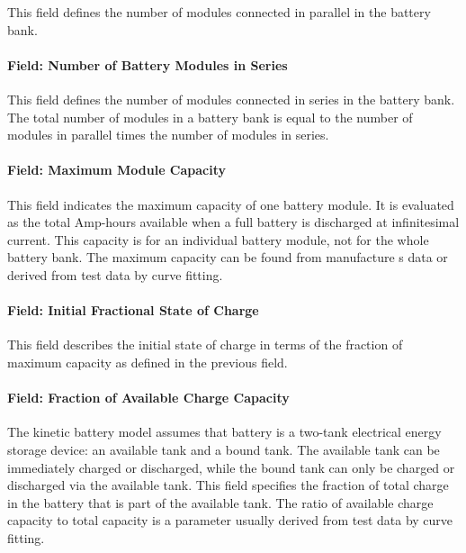 This field defines the number of modules connected in parallel in the battery bank.

\paragraph{Field: Number of Battery Modules in Series}\label{field-number-of-battery-modules-in-series}

This field defines the number of modules connected in series in the battery bank. The total number of modules in a battery bank is equal to the number of modules in parallel times the number of modules in series.

\paragraph{Field: Maximum Module Capacity}\label{field-maximum-module-capacity}

This field indicates the maximum capacity of one battery module. It is evaluated as the total Amp-hours available when a full battery is discharged at infinitesimal current. This capacity is for an individual battery module, not for the whole battery bank. The maximum capacity can be found from manufacture s data or derived from test data by curve fitting.

\paragraph{Field: Initial Fractional State of Charge}\label{field-initial-fractional-state-of-charge}

This field describes the initial state of charge in terms of the fraction of maximum capacity as defined in the previous field.

\paragraph{Field: Fraction of Available Charge Capacity}\label{field-fraction-of-available-charge-capacity}

The kinetic battery model assumes that battery is a two-tank electrical energy storage device: an available tank and a bound tank. The available tank can be immediately charged or discharged, while the bound tank can only be charged or discharged via the available tank. This field specifies the fraction of total charge in the battery that is part of the available tank. The ratio of available charge capacity to total capacity is a parameter usually derived from test data by curve fitting.

